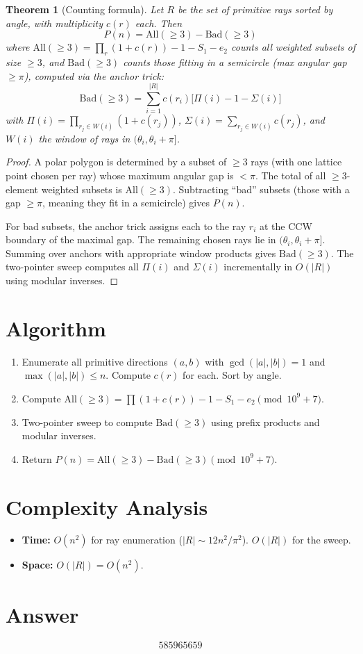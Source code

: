 \documentclass[11pt]{article}
\newtheorem{theorem}{Theorem}
\begin{document}
\begin{theorem}[Counting formula]
\label{thm:count}
Let $R$ be the set of primitive rays sorted by angle, with multiplicity $c(r)$ each. Then
\[
P(n) = \mathrm{All}(\ge 3) - \mathrm{Bad}(\ge 3)
\]
where $\mathrm{All}(\ge 3) = \prod_r (1 + c(r)) - 1 - S_1 - e_2$ counts all weighted subsets of size $\ge 3$, and $\mathrm{Bad}(\ge 3)$ counts those fitting in a semicircle (max angular gap $\ge \pi$), computed via the anchor trick:
\[
\mathrm{Bad}(\ge 3) = \sum_{i=1}^{|R|} c(r_i) \bigl[\Pi(i) - 1 - \Sigma(i)\bigr]
\]
with $\Pi(i) = \prod_{r_j \in W(i)} (1 + c(r_j))$, $\Sigma(i) = \sum_{r_j \in W(i)} c(r_j)$, and $W(i)$ the window of rays in $(\theta_i, \theta_i + \pi]$.
\end{theorem}

\begin{proof}
A polar polygon is determined by a subset of $\ge 3$ rays (with one lattice point chosen per ray) whose maximum angular gap is $< \pi$. The total of all $\ge 3$-element weighted subsets is $\mathrm{All}(\ge 3)$. Subtracting ``bad'' subsets (those with a gap $\ge \pi$, meaning they fit in a semicircle) gives $P(n)$.

For bad subsets, the anchor trick assigns each to the ray $r_i$ at the CCW boundary of the maximal gap. The remaining chosen rays lie in $(\theta_i, \theta_i + \pi]$. Summing over anchors with appropriate window products gives $\mathrm{Bad}(\ge 3)$. The two-pointer sweep computes all $\Pi(i)$ and $\Sigma(i)$ incrementally in $O(|R|)$ using modular inverses.
\end{proof}

\section{Algorithm}

\begin{enumerate}
    \item Enumerate all primitive directions $(a, b)$ with $\gcd(|a|,|b|) = 1$ and $\max(|a|,|b|) \le n$. Compute $c(r)$ for each. Sort by angle.
    \item Compute $\mathrm{All}(\ge 3) = \prod(1 + c(r)) - 1 - S_1 - e_2 \pmod{10^9+7}$.
    \item Two-pointer sweep to compute $\mathrm{Bad}(\ge 3)$ using prefix products and modular inverses.
    \item Return $P(n) = \mathrm{All}(\ge 3) - \mathrm{Bad}(\ge 3) \pmod{10^9+7}$.
\end{enumerate}

\section{Complexity Analysis}

\begin{itemize}
    \item \textbf{Time:} $O(n^2)$ for ray enumeration ($|R| \sim 12n^2/\pi^2$). $O(|R|)$ for the sweep.
    \item \textbf{Space:} $O(|R|) = O(n^2)$.
\end{itemize}

\section{Answer}

\[
\boxed{585965659}
\]
\end{document}
